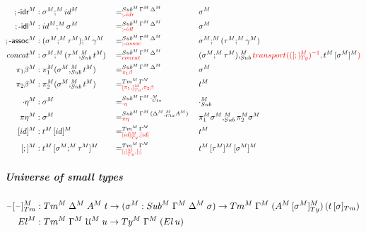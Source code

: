 \documentclass[a4paper,UKenglish,numberwithinsect,cleveref,thm-restate]{lipics-v2021}
\begin{document}
\begin{alignat*}{5}
  ;\text{-}\textsf{idr}^M   & : \sigma^M ;^M \idS^M && =^{\Sub^M\,\Gamma^M\,\Delta^M}_{\alert{;\text{-}\mathsf{idr}}} && \sigma^M \\
  ;\text{-}\textsf{idl}^M   & : \idS^M ;^M \sigma^M && =^{\Sub^M\,\Gamma^M\,\Delta^M}_{\alert{;\text{-}\mathsf{idl}}} && \sigma^M \\
  ;\text{-}\textsf{assoc}^M & : (\sigma^M ;^M \tau^M) ;^M \gamma^M   && =^{\Sub^M\,\Gamma^M\,\Delta^M}_{\alert{;\text{-}\mathsf{assoc}}} && \sigma^M ;^M (\tau^M ;^M \gamma^M) \\
  \mathsf{concat}^M         & : \sigma^M ;^M (\tau^M ,_{\Sub}^M t^M) && =^{\Sub^M\,\Gamma^M\,\Delta^M}_{\alert{\mathsf{concat}}} && (\sigma^M ;^M \tau^M) ,_{\Sub}^M \alert{\transfib{}{([;]^M_{\Ty})^{-1}}{\color{black} \subM{t^M}{\sigma^M}}} \\
  \pi_1\beta^M              & : \pi_1^M (\sigma^M ,^M_{\Sub} t^M)    && =^{\Sub^M\,\Gamma^M\,\Delta^M}_{\alert{\pi_1\beta}}      && \sigma^M \\
  \pi_2\beta^M              & : \pi_2^M (\sigma^M ,^M_{\Sub} t^M)    && =^{\Tm^M\,\Gamma^M}_{\alert{[\pi_1,]^M_{\Ty}, \pi_2\beta}}       && t^M \\
  \cdot\eta^M               & : \sigma^M                             && =^{\Sub^M\,\Gamma^M\,\emptyctx^M_{\Ctx}}_{\alert{\cdot\eta}}  && \emptysub_{\Sub}^M \\
  \pi\eta^M                 & : \sigma^M                             && =^{\Sub^M\,\Gamma^M\,(\Delta^M ,^M_{\Ctx} A^M)}_{\alert{\pi\eta}} {} && \pi_1^M \sigma^M ,_{\Sub}^M \pi_2^M \sigma^M \\
  [\idS]^M                  & : \subM{t^M}{\idS}                     && =^{\Tm^M\,\Gamma^M}_{\alert{[\idS]^M_{\Ty}, [\idS]}} && t^M \\
  [;]^M                     & : \subM{t^M}{\sigma^M ;^M \tau^M}      && =^{\Tm^M\,\Gamma^M}_{\alert{[;]^M_{\Ty}, [;]}} && \subM{\subM{t^M}{\tau^M}}{\sigma^M}
\end{alignat*}

\subparagraph*{Universe of small types}
\begin{alignat*}{10}
  \blank[\blank]_{\Tm}^M & : \Tm^M\;\Delta^M\;A^M\;t \to (\sigma^M : \Sub^M\;\Gamma^M\;\Delta^M\;\sigma) \to \Tm^M\;\Gamma^M\;(\subTyM{A^M}{\sigma^M})\,(\subTm{t}{\sigma}) \\
  \El^M                  & : \Tm^M\;\Gamma^M\;\UU^M\;u \to \Ty^M\;\Gamma^M\;(\El\,u)
\end{alignat*}
\end{document}
